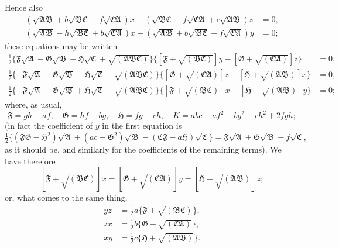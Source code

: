 \documentclass[11pt,a4paper]{article}
\theoremstyle{definition}
\begin{document}
Hence also
\begin{align*}
(\sqrt{\mathfrak{A}\mathfrak{B}} + b\sqrt{\mathfrak{B}\mathfrak{C}} - f\sqrt{\mathfrak{C}\mathfrak{A}})x - (\sqrt{\mathfrak{B}\mathfrak{C}} - f\sqrt{\mathfrak{C}\mathfrak{A}} + c\sqrt{\mathfrak{A}\mathfrak{B}})z &= 0, \\
(\sqrt{\mathfrak{A}\mathfrak{B}} - h\sqrt{\mathfrak{B}\mathfrak{C}} + b\sqrt{\mathfrak{C}\mathfrak{A}})x - (\sqrt{\mathfrak{A}\mathfrak{B}} + b\sqrt{\mathfrak{B}\mathfrak{C}} + f\sqrt{\mathfrak{C}\mathfrak{A}})y &= 0;
\end{align*}
these equations may be written
\begin{align*}
\tfrac{1}{2}\{\mathfrak{F}\sqrt{\mathfrak{A}} - \mathfrak{G}\sqrt{\mathfrak{B}} - \mathfrak{H}\sqrt{\mathfrak{C}} + \sqrt{(\mathfrak{A}\mathfrak{B}\mathfrak{C})}\}\{[\mathfrak{F} + \sqrt{(\mathfrak{B}\mathfrak{C})}]y - [\mathfrak{G} + \sqrt{(\mathfrak{C}\mathfrak{A})}]z\} &= 0, \\
\tfrac{1}{2}\{-\mathfrak{F}\sqrt{\mathfrak{A}} + \mathfrak{G}\sqrt{\mathfrak{B}} - \mathfrak{H}\sqrt{\mathfrak{C}} + \sqrt{(\mathfrak{A}\mathfrak{B}\mathfrak{C})}\}\{[\mathfrak{G} + \sqrt{(\mathfrak{C}\mathfrak{A})}]z - [\mathfrak{H} + \sqrt{(\mathfrak{A}\mathfrak{B})}]x\} &= 0, \\
\tfrac{1}{2}\{-\mathfrak{F}\sqrt{\mathfrak{A}} - \mathfrak{G}\sqrt{\mathfrak{B}} + \mathfrak{H}\sqrt{\mathfrak{C}} + \sqrt{(\mathfrak{A}\mathfrak{B}\mathfrak{C})}\}\{[\mathfrak{F} + \sqrt{(\mathfrak{B}\mathfrak{C})}]x - [\mathfrak{H} + \sqrt{(\mathfrak{A}\mathfrak{B})}]y\} &= 0;
\end{align*}
where, as usual,
\[
\mathfrak{F} = gh - af, \quad \mathfrak{G} = hf - bg, \quad \mathfrak{H} = fg - ch, \quad K = abc - af^{2} - bg^{2} - ch^{2} + 2fgh;
\]
(in fact the coefficient of $y$ in the first equation is
\[
\tfrac{1}{2}\{(\mathfrak{F}\mathfrak{G} - \mathfrak{H}^{2})\sqrt{\mathfrak{A}} + (ac - \mathfrak{G}^{2})\sqrt{\mathfrak{B}} - (\mathfrak{C}\mathfrak{F} - a\mathfrak{H})\sqrt{\mathfrak{C}}\} = \mathfrak{F}\sqrt{\mathfrak{A}} + \mathfrak{G}\sqrt{\mathfrak{B}} - f\sqrt{\mathfrak{C}},
\]
as it should be, and similarly for the coefficients of the remaining terms). We have therefore
\[
[\mathfrak{F} + \sqrt{(\mathfrak{B}\mathfrak{C})}]x = [\mathfrak{G} + \sqrt{(\mathfrak{C}\mathfrak{A})}]y = [\mathfrak{H} + \sqrt{(\mathfrak{A}\mathfrak{B})}]z;
\]
or, what comes to the same thing,
\begin{align*}
yz &= \tfrac{1}{2}a\{\mathfrak{F} + \sqrt{(\mathfrak{B}\mathfrak{C})}\}, \\
zx &= \tfrac{1}{2}b\{\mathfrak{G} + \sqrt{(\mathfrak{C}\mathfrak{A})}\}, \\
xy &= \tfrac{1}{2}c\{\mathfrak{H} + \sqrt{(\mathfrak{A}\mathfrak{B})}\}.
\end{align*}
\end{document}
